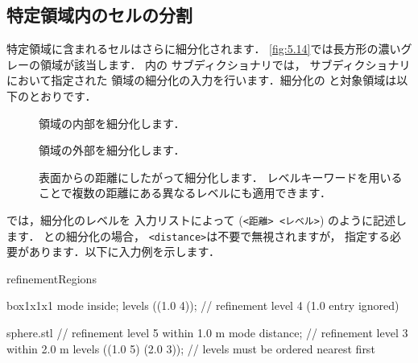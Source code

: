 \subsection{特定領域内のセルの分割}
\label{ssec:5.4.5}
特定領域に含まれるセルはさらに細分化されます．
\autoref{fig:5.14}では長方形の濃いグレーの領域が該当します．
%
%
内の
%
%
サブディクショナリでは，
サブディクショナリにおいて指定された
領域の細分化の入力を行います．細分化の
%
%
と対象領域は以下のとおりです．
\begin{description}
 \item[]
%
%
            領域の内部を細分化します．
 \item[]
%
%
            領域の外部を細分化します．
 \item[]
%
%
            表面からの距離にしたがって細分化します．
            レベルキーワードを用いることで複数の距離にある異なるレベルにも適用できます．
\end{description}
%
%
では，細分化のレベルを
%
%
入力リストによって
(\verb|<距離> <レベル>|) のように記述します．
との細分化の場合，
\verb|<distance>|は不要で無視されますが，
指定する必要があります．以下に入力例を示します．
\begin{OFverbatim}[file]
refinementRegions
{
    box1x1x1
    {
        mode inside;
        levels ((1.0 4));         // refinement level 4 (1.0 entry ignored)
    }

    sphere.stl
    {                             // refinement level 5 within 1.0 m
        mode distance;            // refinement level 3 within 2.0 m
        levels ((1.0 5) (2.0 3)); // levels must be ordered nearest first
    }
}
\end{OFverbatim}


